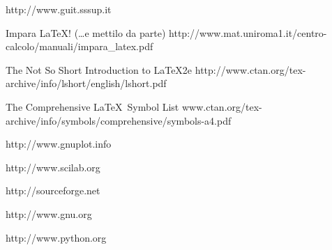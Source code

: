 \begin{thebibliography}{100}
{http://www.guit.sssup.it}

{Impara {\LaTeX}! (\ldots e mettilo da parte)}
{http://www.mat.uniroma1.it/centro-calcolo/manuali/impara\_latex.pdf}

{The Not So Short Introduction to \LaTeX2e}
{http://www.ctan.org/tex-archive/info/lshort/english/lshort.pdf}

{The Comprehensive \LaTeX\ Symbol List}
{www.ctan.org/tex-archive/info/symbols/comprehensive/symbols-a4.pdf}

{http://www.gnuplot.info}

{http://www.scilab.org}

{http://sourceforge.net}

{http://www.gnu.org}

{http://www.python.org}

\end{thebibliography}


